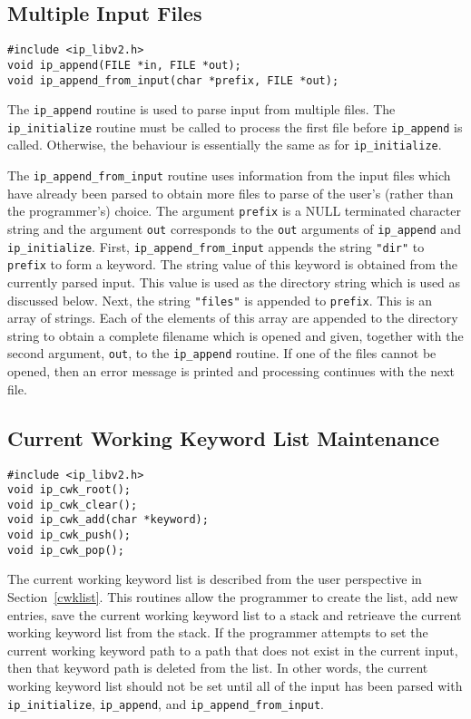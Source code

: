 \subsection{Multiple Input Files}
\begin{verbatim}
#include <ip_libv2.h>
void ip_append(FILE *in, FILE *out);
void ip_append_from_input(char *prefix, FILE *out);
\end{verbatim}
The \verb|ip_append| routine is used to parse input from multiple files.
The \verb|ip_initialize| routine must be called to process the first
file before \verb|ip_append| is called.  Otherwise, the behaviour is
essentially the same as for \verb|ip_initialize|.

The \verb|ip_append_from_input| routine uses information from the
input files which have already been parsed to obtain more
files to parse of the user's (rather than the programmer's) choice.
The argument \verb|prefix| is a NULL terminated character string
and the argument \verb|out| corresponds to the \verb|out| arguments
of \verb|ip_append| and \verb|ip_initialize|.
First, \verb|ip_append_from_input| appends the string \verb|"dir"| to
\verb|prefix| to form a keyword.  The string value of this keyword is
obtained from the currently parsed input.  This value is used as
the directory string which is used as discussed below.  Next, the
string \verb|"files"| is appended to \verb|prefix|.  This is an
array of strings.  Each of the elements of this array are appended
to the directory string to obtain a complete filename which is opened
and given, together with the second argument, \verb|out|, to the
\verb|ip_append| routine.  If one of the files cannot be opened, then
an error message is printed and processing continues with the next
file.

\subsection{Current Working Keyword List Maintenance}
\begin{verbatim}
#include <ip_libv2.h>
void ip_cwk_root();
void ip_cwk_clear();
void ip_cwk_add(char *keyword);
void ip_cwk_push();
void ip_cwk_pop();
\end{verbatim}
The current working keyword list is described from the user
perspective in Section~\ref{cwklist}.  This routines allow
the programmer to create the list, add new entries, save the
current working keyword list to a stack and retrieave the
current working keyword list from the stack.  If the programmer
attempts to set the current working keyword path to a path that
does not exist in the current input, then that keyword path is
deleted from the list.  In other words, the current working keyword
list should not be set until all of the input has been parsed with
\verb|ip_initialize|, \verb|ip_append|, and \verb|ip_append_from_input|.

